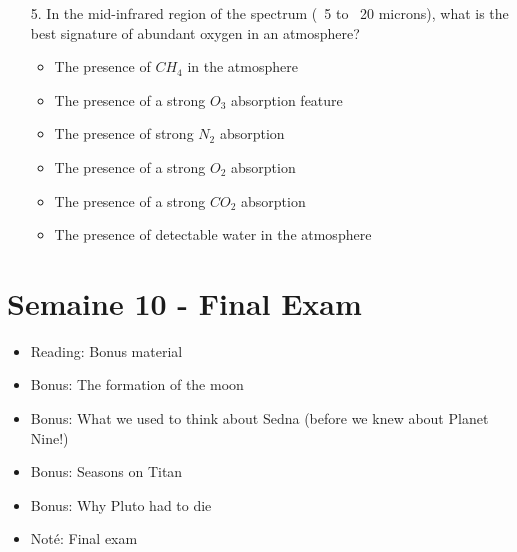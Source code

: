 \begin{enumerate}
\item[5.] In the mid-infrared region of the spectrum (~5 to ~20 microns), what is the best signature of  abundant oxygen in an atmosphere?

\begin{itemize}[label={$\bullet$}]
    \item The presence of $CH_4$ in the atmosphere
    \item The presence of a strong $O_3$ absorption feature
    \item The presence of strong $N_2$ absorption
    \item The presence of a strong $O_2$ absorption
    \item The presence of a strong $CO_2$ absorption
    \item The presence of detectable water in the atmosphere
\end{itemize}

\end{enumerate}

\section*{Semaine 10 - Final Exam}

\begin{itemize}[label={$\bullet$}]
    \item Reading: Bonus material
    \item Bonus: The formation of the moon
    \item Bonus: What we used to think about Sedna (before we knew about Planet Nine!)
    \item Bonus: Seasons on Titan
    \item Bonus: Why Pluto had to die
    \item Noté: Final exam
\end{itemize}

\newpage

